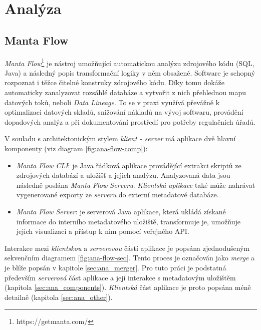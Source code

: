 \chapter{Analýza}
\section{Manta Flow}
\textit{Manta Flow}\footnote{https://getmanta.com/} je nástroj umožňující automatickou analýzu zdrojového kódu (SQL, Java) a následný popis transformační logiky v něm obsažené. Software je schopný rozpoznat i těžce čitelné konstruky zdrojového kódu. Díky tomu dokáže automaticky zanalyzovat rozsáhlé databáze a vytvořit z nich přehlednou mapu datových toků, neboli \textit{Data Lineage}. To se v praxi využívá převážně k optimalizaci datových skladů, snižování nákladů na vývoj softwaru, provádění dopadových analýz a při dokumentování prostředí pro potřeby regulačních úřadů.

V souladu s architektonickým stylem \textit{klient - server} má aplikace dvě hlavní komponenty (viz diagram \ref{fig:ana-flow-comp}):
\begin{itemize}
	\item{\textit{Manta Flow CLI}}: je Java řádková aplikace provádějící extrakci skriptů ze zdrojových databází a uložišť a jejich analýzu. Analyzovaná data jsou následně poslána \textit{Manta Flow Serveru}. \textit{Klientská aplikace} také může nahrávat vygenerované exporty ze \textit{serveru} do externí metadatové databáze.
	\item{\textit{Manta Flow Server}}: je serverová Java aplikace, která ukládá získané informace do interního metadatového uložiště, transformuje je, umožňuje jejich visualizaci a přístup k nim pomocí veřejného API.
\end{itemize}

Interakce mezi \textit{klientskou} a \textit{serverovou} částí aplikace je popsána zjednodušeným sekvenčním diagramem \ref{fig:ana-flow-seq}. Tento proces je označován jako \textit{merge} a je blíže popsán v kapitole \ref{sec:ana_merger}.
Pro tuto práci je podstatná především \textit{serverová} část aplikace a její interakce s metadatovým uložištěm (kapitola \ref{sec:ana_components}). \textit{Klientská} část aplikace je proto popsána méně detailně (kapitola \ref{sec:ana_other}).

